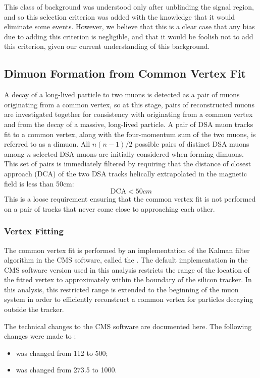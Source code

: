 \pagebreak
This class of background was understood only after unblinding the signal region, and so this selection criterion was added with the knowledge that it would eliminate some events.
However, we believe that this is a clear case that any bias due to adding this criterion is negligible, and that it would be foolish not to add this criterion, given our current understanding of this background.

\subsection{Dimuon Formation from Common Vertex Fit}
\label{sec:dd:DimVertex}
A decay of a long-lived particle to two muons is detected as a pair of muons originating from a common vertex, so at this stage, pairs of reconstructed muons are investigated together for consistency with originating from a common vertex and from the decay of a massive, long-lived particle.
A pair of DSA muon tracks fit to a common vertex, along with the four-momentum sum of the two muons, is referred to as a dimuon.
All $n(n-1)/2$ possible pairs of distinct DSA muons among $n$ selected DSA muons are initially considered when forming dimuons.
This set of pairs is immediately filtered by requiring that the distance of closest approach (DCA) of the two DSA tracks helically extrapolated in the magnetic field is less than 50\unit{cm}:
$$\text{DCA} < 50\unit{cm}$$
This is a loose requirement ensuring that the common vertex fit is not performed on a pair of tracks that never come close to approaching each other.

\subsubsection{Vertex Fitting}
\label{sec:dd:VertexFitting}
The common vertex fit is performed by an implementation of the Kalman filter algorithm in the CMS software, called the  \cite{Fruhwirth:1987fm,Speer:927395}.
The default implementation in the CMS software version used in this analysis restricts the range of the location of the fitted vertex to approximately within the boundary of the silicon tracker.
In this analysis, this restricted range is extended to the beginning of the muon system in order to efficiently reconstruct a common vertex for particles decaying outside the tracker.

The technical changes to the CMS software are documented here.
The following changes were made to :
\begin{itemize}
  \item {} was changed from 112 to 500;
  \item {} was changed from 273.5 to 1000.
\end{itemize}

